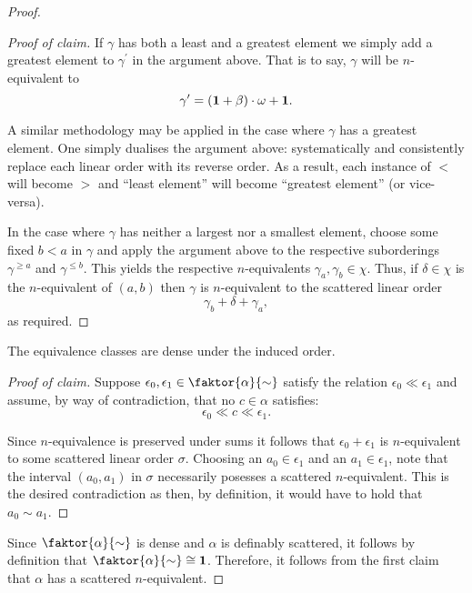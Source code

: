 \begin{proof}
\begin{proof}[Proof of claim]
		If $\gamma$ has both a least and a greatest element we simply add a
		greatest element to $\gamma^\prime$ in the argument above.  That is to
		say, $\gamma$ will be $n$-equivalent to
		\begin{equation}
			\gamma^\prime=(\mathbf{1}+\beta)\cdot\omega+\mathbf{1}.
		\end{equation}

		A similar methodology may be applied in the case where $\gamma$ has a
		greatest element. One simply dualises the argument above: systematically
		and consistently replace each linear order with its reverse order.  As a
		result, each instance of $<$ will become $>$ and ``least element'' will
		become ``greatest element'' (or vice-versa).

		In the case where $\gamma$ has neither a largest nor a smallest element,
		choose some fixed $b<a$ in $\gamma$ and apply the argument above to the
		respective suborderings $\gamma^{\geq a}$ and $\gamma^{\leq b}$.  This
		yields the respective $n$-equivalents $\gamma_a,\gamma_b\in\chi$.  Thus,
		if $\delta\in\chi$ is the $n$-equivalent of $(a,b)$ then $\gamma$ is
		$n$-equivalent to the scattered linear order
		\begin{equation}
			\gamma_b+\delta+\gamma_a,
		\end{equation}
		as required.\noqed
	\end{proof}

	\begin{claim}
		The equivalence classes are dense under the induced order.
	\end{claim}
	\begin{proof}[Proof of claim]
		Suppose $\epsilon_0,\epsilon_1\in\faktor{\alpha}{\sim}$ satisfy the
		relation $\epsilon_0\ll\epsilon_1$ and assume, by way of contradiction,
		that no $c\in\alpha$ satisfies:
		\begin{equation}
			\epsilon_0\ll c\ll\epsilon_1.
		\end{equation}

		Since $n$-equivalence is preserved under sums it follows that
		$\epsilon_0+\epsilon_1$ is $n$-equivalent to some scattered linear order
		$\sigma$.  Choosing an $a_0\in\epsilon_1$ and an $a_1\in\epsilon_1$,
		note that the interval $(a_0,a_1)$ in $\sigma$ necessarily posesses a
		scattered $n$-equivalent.  This is the desired contradiction as then, by
		definition, it would have to hold that $a_0\sim a_1$.\noqed
	\end{proof}
	Since $\faktor{\alpha}{\sim}$ is dense and $\alpha$ is definably scattered,
	it follows by definition that $\faktor{\alpha}{\sim}\cong\one$.  Therefore,
	it follows from the first claim that $\alpha$ has a scattered
	$n$-equivalent.
\end{proof}

